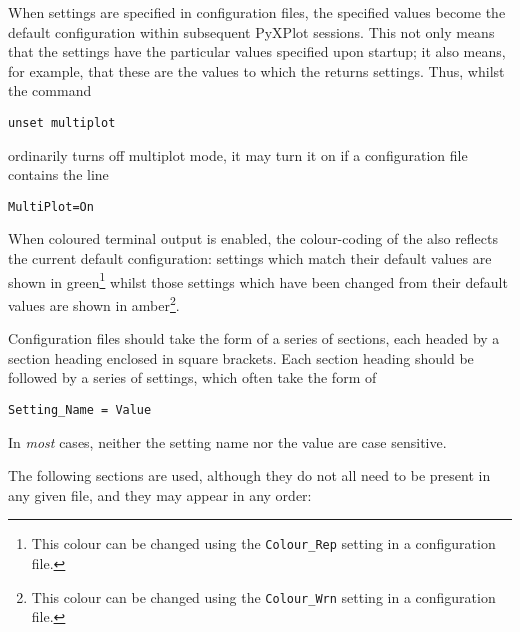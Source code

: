 When settings are specified in configuration files, the specified values become
the default configuration within subsequent PyXPlot sessions. This not only
means that the settings have the particular values specified upon startup; it
also means, for example, that these are the values to which the 
returns settings. Thus, whilst the command
\begin{verbatim}
unset multiplot
\end{verbatim}
ordinarily turns off multiplot mode, it may turn it on if a configuration file
contains the line
\begin{verbatim}
MultiPlot=On
\end{verbatim}
When coloured terminal output is enabled, the colour-coding of the
 also reflects the current default configuration: settings which
match their default values are shown in green\footnote{This colour can be
changed using the {\tt Colour\_Rep} setting in a configuration file.} whilst
those settings which have been changed from their default values are shown in
amber\footnote{This colour can be changed using the {\tt Colour\_Wrn} setting
in a configuration file.}.

Configuration files should take the form of a series of sections, each headed
by a section heading enclosed in square brackets. Each section heading should
be followed by a series of settings, which often take the form of
\begin{verbatim}
Setting_Name = Value
\end{verbatim}
In {\it most} cases, neither the setting name nor the value are case sensitive.

The following sections are used, although they do not all need to be present in
any given file, and they may appear in any order:

